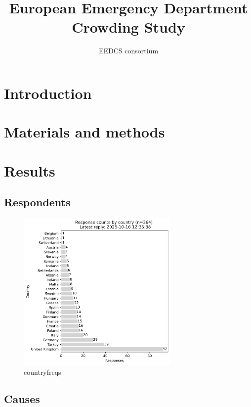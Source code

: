 \documentclass{article}
\title{European Emergency Department Crowding Study}
\author{EEDCS consortium}
\begin{document}
\maketitle

\begin{abstract}
    \lipsum[1]    
\end{abstract}

\section{Introduction}
\lipsum[2]
\section{Materials and methods}
\lipsum[3]
\section{Results}


\subsection{Respondents}




\begin{figure}[H]
    \centering
        \includegraphics[width=0.7\textwidth]{../output/plots/country_freqs}
        \caption{countryfreqs}
        \label{fig:country_freqs}
\end{figure}

\subsection{Causes}
\end{document}
